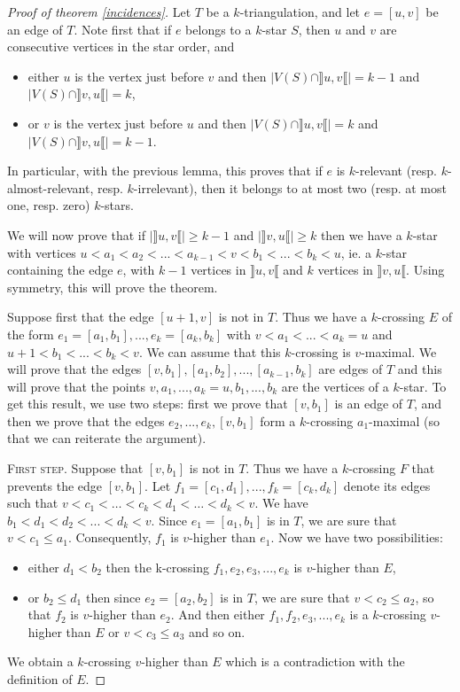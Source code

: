 \documentclass[12pt]{amsart}
\begin{document}
\begin{proof}[Proof of theorem \ref{incidences}]
Let $T$ be a $k$-triangulation, and let $e=[u,v]$ be an edge of $T$. 
Note first that if $e$ belongs to a $k$-star $S$, then $u$ and $v$ are consecutive vertices in the star order, and 
\begin{itemize}
\item either $u$ is the vertex just before $v$ and then $|V(S)\cap\rrbracket u,v\llbracket|=k-1$ and $|V(S)\cap\rrbracket v,u\llbracket|=k$,
\item or $v$ is the vertex just before $u$ and then $|V(S)\cap\rrbracket u,v\llbracket|=k$ and $|V(S)\cap\rrbracket v,u\llbracket|=k-1$.
\end{itemize}
In particular, with the previous lemma, this proves that if $e$ is $k$-relevant (resp. $k$-almost-relevant, resp. $k$-irrelevant), then it belongs to at most two (resp. at most one, resp. zero) $k$-stars.

\bigskip
We will now prove that if $|\rrbracket u,v\llbracket|\ge k-1$ and $|\rrbracket v,u\llbracket|\ge k$ then we have a $k$-star with vertices $u<a_1<a_2<...<a_{k-1}<v<b_1<...<b_k<u$, ie. a $k$-star containing the edge $e$,  with $k-1$ vertices in $\rrbracket u,v\llbracket$ and $k$ vertices in $\rrbracket v,u\llbracket$. Using symmetry, this will prove the theorem.

\bigskip
Suppose first that the edge $[u+1,v]$ is not in $T$. Thus we have a $k$-crossing $E$ of the form $e_1=[a_1,b_1],...,e_k=[a_k,b_k]$ with $v<a_1<...<a_k=u$ and $u+1<b_1<...<b_k<v$. We can assume that this $k$-crossing is $v$-maximal. We will prove that the edges $[v,b_1], [a_1,b_2],..., [a_{k-1},b_k]$ are edges of $T$ and this will prove that the points $v,a_1,...,a_k=u,b_1,...,b_k$ are the vertices of a $k$-star. To get this result, we use two steps: first we prove that $[v,b_1]$ is an edge of $T$, and then we prove that the edges $e_2,...,e_k,[v,b_1]$ form a $k$-crossing $a_1$-maximal (so that we can reiterate the argument).

\medskip
\noindent\textsc{First step.}
Suppose that $[v,b_1]$ is not in $T$. Thus we have a $k$-crossing $F$ that prevents the edge $[v,b_1]$. Let $f_1=[c_1,d_1],...,f_k=[c_k,d_k]$ denote its edges such that $v<c_1<\ldots<c_k<d_1<\ldots<d_k<v$. We have $b_1<d_1<d_2<...<d_k<v$. Since $e_1=[a_1,b_1]$ is in $T$, we are sure that $v<c_1\le a_1$. Consequently, $f_1$ is $v$-higher than $e_1$. Now we have two possibilities:
\begin{itemize}
\item either $d_1<b_2$ then the k-crossing $f_1, e_2, e_3,..., e_k$ is $v$-higher than $E$,
\item or $b_2\le d_1$ then since $e_2=[a_2,b_2]$ is in $T$, we are sure that $v<c_2\le a_2$, so that $f_2$ is $v$-higher than $e_2$. And then either $f_1,f_2,e_3,...,e_k$ is a $k$-crossing $v$-higher than $E$ or $v<c_3\le a_3$ and so on.
\end{itemize}
We obtain a $k$-crossing $v$-higher than $E$ which is a contradiction with the definition of $E$.


\end{proof}
\end{document}
